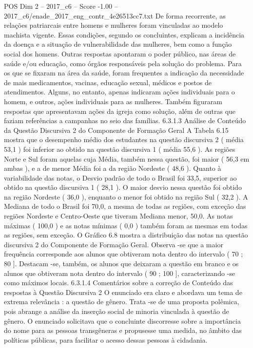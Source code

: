 \begin{textsample}{POS Dim 2 – 2017\_c6 – Score -1.00 – 2017\_c6/enade\_2017\_eng\_contr\_4e26513cc7.txt}
De forma recorrente, as relações patriarcais entre homens e mulheres foram vinculadas ao modelo machista vigente.
Essas condições, segundo os concluintes, explicam a incidência da doença e a situação de vulnerabilidade das mulheres, bem como a função social dos homens.
Outras respostas apontaram o poder público, nas áreas de saúde e/ou educação, como órgãos responsáveis pela solução do problema.
Para os que se fixaram na área da saúde, foram frequentes a indicação da necessidade de mais medicamentos, vacinas, educação sexual, médicos e postos de atendimentos.
Alguns, no entanto, apenas indicaram ações individuais para o homem, e outros, ações individuais para as mulheres.
Também figuraram respostas que apresentavam ações da igreja como solução, além de outras que faziam referências a campanhas no seio das famílias. 6.3.1.3 Análise de Conteúdo da Questão Discursiva 2 do Componente de Formação Geral A Tabela 6.15 mostra que o desempenho médio dos estudantes na questão discursiva 2 ( média 53,1 ) foi inferior ao obtido na questão discursiva 1 ( média 55,6 ).
As regiões Norte e Sul foram aquelas cuja Média, também nessa questão, foi maior ( 56,3 em ambas ), e a de menor Média foi a da região Nordeste ( 48,6 ).
Quanto à variabilidade das notas, o Desvio padrão de todo o Brasil foi 33,5, superior ao obtido na questão discursiva 1 ( 28,1 ).
O maior desvio nessa questão foi obtido na região Nordeste ( 36,0 ), enquanto o menor foi obtido na região Sul ( 32,2 ).
A Mediana de todo o Brasil foi 70,0, a mesma de todas as regiões, com exceção das regiões Nordeste e Centro-Oeste que tiveram Mediana menor, 50,0.
As notas máximas ( 100,0 ) e as notas mínimas ( 0,0 ) também foram as mesmas em todas as regiões, sem exceção.
O Gráfico 6.8 mostra a distribuição das notas na questão discursiva 2 do Componente de Formação Geral.
Observa -se que a maior frequência corresponde aos alunos que obtiveram nota dentro do intervalo ( 70 ; 80 ].
Destacam -se, também, os alunos que deixaram a questão em branco e os alunos que obtiveram nota dentro do intervalo ( 90 ; 100 ], caracterizando -se como máximos locais. 6.3.1.4 Comentários sobre a correção de Conteúdo das respostas à Questão Discursiva 2 O enunciado era claro e abordava um tema de extrema relevância : a questão de gênero.
Trata -se de uma proposta polêmica, pois abrange a análise da inserção social de minoria vinculada à questão de gênero.
O enunciado solicitava que o concluinte discorresse sobre a importância do nome para as pessoas transgêneras e propusesse uma medida, no âmbito das políticas públicas, para facilitar o acesso dessas pessoas à cidadania.

\end{textsample}
